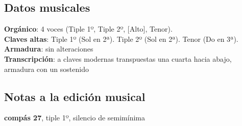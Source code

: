 \subsection*{Datos musicales}
\noindent \textbf{Orgánico}: 4 voces (Tiple 1º, Tiple 2º, [Alto], Tenor).\\
\textbf{Claves altas}: Tiple 1º (Sol en 2ª). Tiple 2º (Sol en 2ª). Tenor (Do en 3ª).\\
\textbf{Armadura}: sin alteraciones\\
\textbf{Transcripción}: a claves modernas transpuestas una cuarta hacia abajo, armadura con un sostenido

\subsection*{Notas a la edición musical}
\noindent \textbf{compás 27}, tiple 1º, silencio de semimínima 
